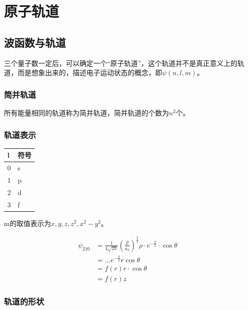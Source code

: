 
\chapter{原子轨道}




\section{波函数与轨道}

三个量子数一定后，可以确定一个“原子轨道”，这个轨道并不是真正意义上的轨道，而是想象出来的，描述电子运动状态的概念，即$\psi(n, l, m)$。


\subsection{简并轨道}


所有能量相同的轨道称为简并轨道，简并轨道的个数为$n^2$个。


\subsection{轨道表示}

\begin{table}[H]
    \centering
    \begin{tabular}{ll}
        \toprule
        l & 符号 \\ 
        \midrule
        0 & s \\
        1 & p \\ 
        2 & d \\
        3 & f \\
        \bottomrule
    \end{tabular}

\end{table}
m的取值表示为$x, y, z, z^2, x^2 - y^2$。

\begin{align*}
    \psi_{210} &= \frac{1}{4 \sqrt{2 \pi}} \left( \frac{Z}{a_0} \right)^{\frac{3}{2}} \rho \cdot e^{-\frac{\rho}{2}} \cdot \cos \theta \\ 
    &= \dots e^{-\frac{\rho}{2}} r \cos \theta \\
    &= f(r) r \cdot \cos \theta \\
    &= f(r) z
\end{align*}


\subsection{轨道的形状}

